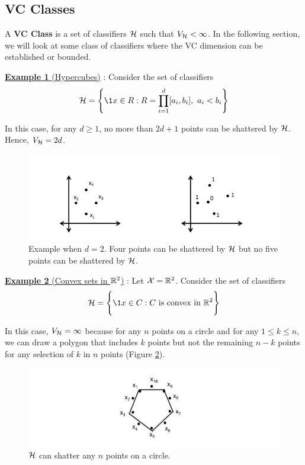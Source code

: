 \subsection{VC Classes}
\begin{definition}[VC Class]
    A \textbf{VC Class} is a set of classifiers $\mathcal{H}$ such that $V_{\mathcal{H}} < \infty$. In the following section, we will look at some class of classifiers where the VC dimension can be established or bounded.
\end{definition}

\noindent\newline\underline{\textbf{Example 1 } (Hypercubes)} : Consider the set of classifiers
\begin{align*}
    \Hf = \biggCurl{
        \1{x \in R} : R = \prod_{i=1}^d [a_i, b_i], \ a_i < b_i
    }
\end{align*}

\noindent In this case, for any $d\ge1$, no more than $2d+1$ points can be shattered by $\mathcal{H}$. Hence, $V_{\mathcal{H}}=2d$.
\begin{figure}[ht]
    \centering
    \includegraphics[width=\textwidth]{figures/vc_class_hypercubes_example.png}
    \caption{Example when $d=2$. Four points can be shattered by $\mathcal{H}$ but no five points can be shattered by $\mathcal{H}$.}
    \label{fig:vc_class_example_hypercubes}
\end{figure}

\noindent\newline\underline{\textbf{Example 2 } (Convex sets in $\mathbb{R}^2$)} : Let $\mathcal{X}=\mathbb{R}^2$. Consider the set of classifiers
\begin{align*}
    \Hf = \biggCurl{
        \1{x\in C} : C \text{ is convex in } \R^2
    }
\end{align*}

\noindent In this case, $V_{\mathcal{H}}=\infty$ because for any $n$ points on a circle and for any $1\le k \le n$, we can draw a polygon that includes $k$ points but not the remaining $n-k$ points for any selection of $k$ in $n$ points (Figure \ref{fig:vc_class_example_convexset}).
\begin{figure}[ht]
    \centering
    \includegraphics[width=\textwidth]{figures/vc_class_convex_set_example.png}
    \caption{$\mathcal{H}$ can shatter any $n$ points on a circle.}
    \label{fig:vc_class_example_convexset}
\end{figure}

